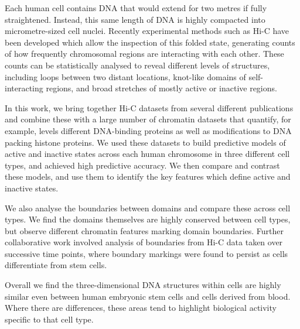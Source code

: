 \documentclass[a4paper,11pt,twoside,toc=listof]{scrbook}
\begin{document}
Each human cell contains DNA that would extend for two metres if fully straightened. Instead, this same length of DNA is highly compacted into micrometre-sized cell nuclei. Recently experimental methods such as Hi-C have been developed which allow the inspection of this folded state, generating counts of how frequently chromosomal regions are interacting with each other. These counts can be statistically analysed to reveal different levels of structures, including loops between two distant locations, knot-like domains of self-interacting regions, and broad stretches of mostly active or inactive regions. 

In this work, we bring together Hi-C datasets from several different publications and combine these with a large number of chromatin datasets that quantify, for example, levels different DNA-binding proteins as well as modifications to DNA packing histone proteins. We used these datasets to build predictive models of active and inactive states across each human chromosome in three different cell types, and achieved high predictive accuracy. We then compare and contrast these models, and use them to identify the key features which define active and inactive states. 

We also analyse the boundaries between domains and compare these across cell types. We find the domains themselves are highly conserved between cell types, but observe different chromatin features marking domain boundaries. Further collaborative work involved analysis of boundaries from Hi-C data taken over successive time points, where boundary markings were found to persist as cells differentiate from stem cells.

Overall we find the three-dimensional DNA structures within cells are highly similar even between human embryonic stem cells and cells derived from blood. Where there are differences, these areas tend to highlight biological activity specific to that cell type.

\clearpage

\tableofcontents 
\clearpage


\listoffigures

\clearpage

\listoftables
\clearpage
\end{document}
